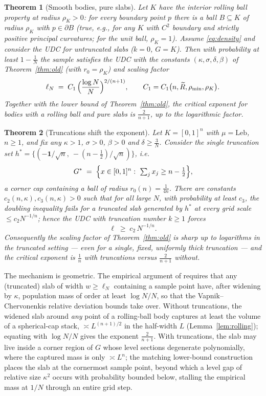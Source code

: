 ﻿\documentclass[11pt]{article}
\newtheorem{theorem}{Theorem}[section]
\begin{document}
\begin{theorem}[Smooth bodies, pure slabs]\label{thm:smooth}
Let $K$ have the interior rolling ball property at radius $\rho_K>0$: for every
boundary point $p$ there is a ball $B\subseteq K$ of radius $\rho_K$ with
$p\in\partial B$ {\rm(}true, e.g., for any $K$ with $C^2$ boundary and strictly
positive principal curvatures; for the unit ball, $\rho_K=1${\rm)}.  Assume
\eqref{eq:density} and consider the UDC for \emph{untruncated} slabs ($k=0$,
$G=K$).  Then with probability at least $1-\frac1N$ the sample satisfies the
UDC with the constants $(\kappa,\sigma,\delta,\beta)$ of Theorem~\ref{thm:old}
{\rm(}with $r_0=\rho_K${\rm)} and scaling factor
\[
\ell_N\;=\;C_1\,\Bigl(\frac{\log N}{N}\Bigr)^{2/(n+1)},
\qquad
C_1=C_1\bigl(n,\widetilde R,\rho_{\min},\rho_K\bigr).
\]
Together with the lower bound of Theorem~\ref{thm:old}, the critical exponent
for bodies with a rolling ball and pure slabs is $\frac{2}{n+1}$, up to the
logarithmic factor.
\end{theorem}

\begin{theorem}[Truncations shift the exponent]\label{thm:wedge}
Let $K=[0,1]^n$ with $\mu=\mathrm{Leb}$, $n\ge1$, and fix any
$\kappa>1$, $\sigma>0$, $\beta>0$ and $\delta\ge\frac3N$.  Consider the single
truncation set $h^*=\{(-\mathbf 1/\sqrt n,\ -(n-\tfrac12)/\sqrt n)\}$, i.e.
\[
G^*\;=\;\Bigl\{x\in[0,1]^n:\ \textstyle\sum_jx_j\ge n-\tfrac12\Bigr\},
\]
a corner cap containing a ball of radius $r_0(n)=\frac{1}{4n}$.  There are
constants $c_2(n,\kappa),c_3(n,\kappa)>0$ such that for all large $N$, with
probability at least $c_3$, the doubling inequality fails for a truncated slab
generated by $h^*$ at \emph{every} grid scale $\le c_2N^{-1/n}$; hence the UDC
with truncation number $k\ge1$ forces
\[
\ell\;\ge\;c_2\,N^{-1/n}.
\]
Consequently the scaling factor of Theorem~\ref{thm:old} is sharp up to
logarithms in the truncated setting --- even for a single, fixed, uniformly
thick truncation --- and the critical exponent is $\frac1n$ with truncations
versus $\frac{2}{n+1}$ without.
\end{theorem}

The mechanism is geometric.  The empirical argument of \cite{companion2}
requires that any (truncated) slab of width $w\ge\ell_N$ containing a sample
point have, after widening by $\kappa$, population mass of order at least
$\log N/N$, so that the Vapnik--Chervonenkis relative deviation bounds take
over.  Without truncations, the widened slab around \emph{any} point of a
rolling-ball body captures at least the volume of a spherical-cap stack,
$\asymp L^{(n+1)/2}$ in the half-width $L$
(Lemma~\ref{lem:rolling}); equating with $\log N/N$ gives the exponent
$\frac2{n+1}$.  With truncations, the slab may live inside a corner region of
$G$ whose level sections degenerate polynomially, where the captured mass is
only $\asymp L^n$; the matching lower-bound construction places the slab at the
cornermost sample point, beyond which a level gap of relative size $\kappa^2$
occurs with probability bounded below, stalling the empirical mass at $1/N$
through an entire grid step.
\end{document}
